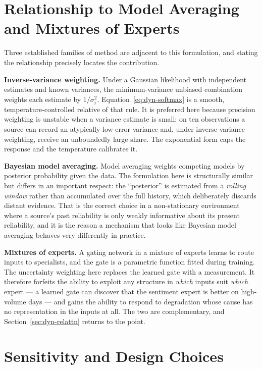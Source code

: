 \section{Relationship to Model Averaging and Mixtures of Experts}
\label{sec:dyn-related}

Three established families of method are adjacent to this formulation, and stating the
relationship precisely locates the contribution.

\textbf{Inverse-variance weighting.} Under a Gaussian likelihood with independent estimates and
known variances, the minimum-variance unbiased combination weights each estimate by
$1/\sigma_i^2$. Equation~\eqref{eq:dyn-softmax} is a smooth, temperature-controlled relative of
that rule. It is preferred here because precision weighting is unstable when a variance estimate
is small: on ten observations a source can record an atypically low error variance and, under
inverse-variance weighting, receive an unboundedly large share. The exponential form caps the
response and the temperature calibrates it.

\textbf{Bayesian model averaging.} Model averaging weights competing models by posterior
probability given the data. The formulation here is structurally similar but differs in an
important respect: the ``posterior'' is estimated from a \emph{rolling window} rather than
accumulated over the full history, which deliberately discards distant evidence. That is the
correct choice in a non-stationary environment where a source's past reliability is only weakly
informative about its present reliability, and it is the reason a mechanism that looks like
Bayesian model averaging behaves very differently in practice.

\textbf{Mixtures of experts.} A gating network in a mixture of experts learns to route inputs to
specialists, and the gate is a parametric function fitted during training. The uncertainty
weighting here replaces the learned gate with a measurement. It therefore forfeits the ability to
exploit any structure in \emph{which} inputs suit \emph{which} expert --- a learned gate can
discover that the sentiment expert is better on high-volume days --- and gains the ability to
respond to degradation whose cause has no representation in the inputs at all. The two are
complementary, and Section~\ref{sec:dyn-relattn} returns to the point.

\section{Sensitivity and Design Choices}
\label{sec:dyn-sensitivity}

